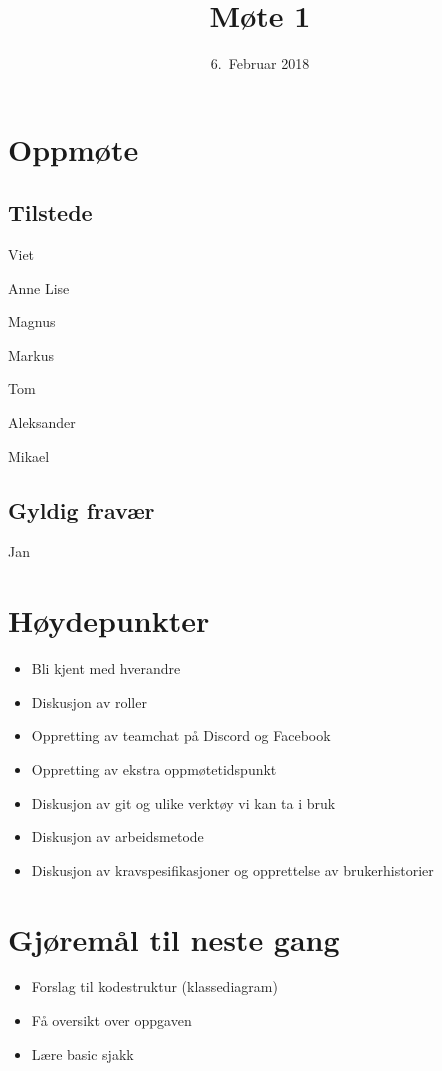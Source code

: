 \documentclass[letterpaper,11pt]{article}
\title{Møte 1}
\date{6.~Februar 2018}
\begin{document}
\maketitle
\section*{Oppmøte}
\subsection*{Tilstede}
\begin{list}{}{}
	\item Viet
	\item Anne Lise
	\item Magnus
	\item Markus
	\item Tom
	\item Aleksander
	\item Mikael
\end{list}
\subsection*{Gyldig fravær}
\begin{list}{}{}
	\item Jan
\end{list}

\newpage
\section*{Høydepunkter}
\begin{itemize}
	\item Bli kjent med hverandre
	\item Diskusjon av roller
	\item Oppretting av teamchat på Discord og Facebook
	\item Oppretting av ekstra oppmøtetidspunkt
	\item Diskusjon av git og ulike verktøy vi kan ta i bruk
	\item Diskusjon av arbeidsmetode
	\item Diskusjon av kravspesifikasjoner og opprettelse av brukerhistorier
\end{itemize}

\section*{Gjøremål til neste gang}
\begin{itemize}
	\item Forslag til kodestruktur (klassediagram)
	\item Få oversikt over oppgaven
	\item Lære basic sjakk
\end{itemize}
\end{document}
